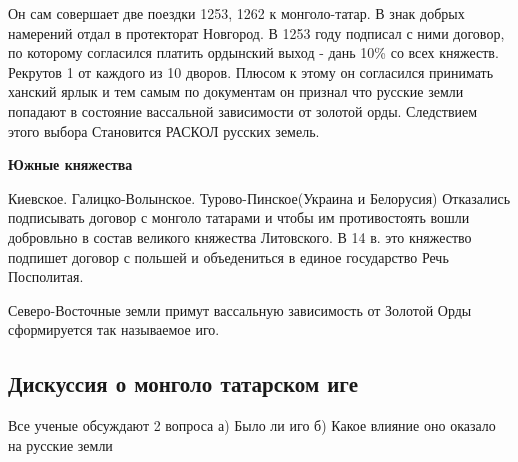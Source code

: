 \documentclass[a4paper]{article}
\begin{document}
Он сам совершает две поездки 1253, 1262 к монголо-татар. В знак добрых намерений отдал в протекторат Новгород.
В 1253 году подписал с ними договор, по которому согласился платить ордынский выход - дань 10\% со всех княжеств. Рекрутов 1 от каждого из 10 дворов. Плюсом к этому он согласился принимать ханский ярлык и тем самым по документам он признал что русские земли попадают в состояние вассальной зависимости от золотой орды. Следствием этого выбора Становится РАСКОЛ русских 
земель.

\textbf{Южные княжества}
\begin{enumerate}
    
\end{enumerate}
Киевское. 
Галицко-Волынское.
Турово-Пинское(Украина и Белорусия)
Отказались подписывать договор с монголо татарами и чтобы им противостоять вошли добровльно в состав великого княжества Литовского.
В 14 в. это княжество подпишет договор с польшей и объедениться в единое государство Речь Посполитая.

Северо-Восточные земли примут вассальную зависимость от Золотой Орды сформируется так называемое иго.

\subsection{Дискуссия о монголо татарском иге}
Все ученые обсуждают 2 вопроса
а) Было ли иго
б) Какое влияние оно оказало на русские земли
\end{document}

